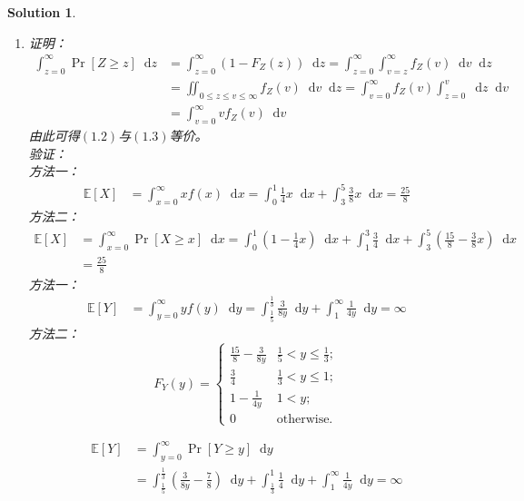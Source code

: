 \documentclass[a4paper,UTF8]{article}
\numberwithin{equation}{section}
\newtheorem*{mySol}{Solution}
\newcommand*\diff{\mathop{}\!\mathrm{d}}
\begin{document}
\begin{mySol}
\begin{enumerate}
\item 
证明：
\begin{equation}
\begin{aligned}
\int_{z=0}^{\infty}\Pr[Z\geq z] \diff z 
&= \int_{z=0}^{\infty}(1-F_Z(z)) \diff z = \int_{z=0}^{\infty}\int_{v=z}^{\infty}f_Z(v) \diff v \diff z\\
&= \iint_{0 \leq z \leq v \leq \infty}f_Z(v) \diff v \diff z = \int_{v=0}^{\infty}f_Z(v)\int_{z=0}^{v}\diff z \diff v \\
&= \int_{v=0}^{\infty}vf_Z(v)\diff v
\end{aligned}
\end{equation}
由此可得$(1.2)$与$(1.3)$等价。\\
验证：\\
方法一：
\begin{equation}
\begin{aligned}
\mathbb{E}[X] &= \int_{x=0}^{\infty}xf(x) \diff x = \int_{0}^{1}\frac{1}{4}x\diff x + \int_{3}^{5}\frac{3}{8}x\diff x =\frac{25}{8}
\end{aligned}
\end{equation}
方法二：
\begin{equation}
\begin{aligned}
\mathbb{E}[X] &= \int_{x=0}^{\infty}\Pr[X\geq x] \diff x = \int_{0}^{1}(1-\frac{1}{4}x)\diff x 
+ \int_{1}^{3}\frac{3}{4}\diff x
+ \int_{3}^{5}(\frac{15}{8}-\frac{3}{8}x)\diff x\\
&= \frac{25}{8}
\end{aligned}
\end{equation}
方法一：
\begin{equation}
\begin{aligned}
\mathbb{E}[Y] &= \int_{y=0}^{\infty}yf(y) \diff y = \int_{\frac{1}{5}}^{\frac{1}{3}}\frac{3}{8y}\diff y + \int_{1}^{\infty}\frac{1}{4y}\diff y = \infty
\end{aligned}
\end{equation}
方法二：
\begin{equation}
F_Y(y) =
\begin{cases}
\frac{15}{8} - \frac{3}{8y} & \frac{1}{5}<y\leq\frac{1}{3};\\
\frac{3}{4} & \frac{1}{3} < y \leq 1;\\
1-\frac{1}{4y} & 1 < y;\\
0 & \mbox{otherwise.}
\end{cases}
\end{equation}

\begin{equation}
\begin{aligned}
\mathbb{E}[Y] &= \int_{y=0}^{\infty}\Pr[Y \geq y] \diff y\\ 
&= \int_{\frac{1}{5}}^{\frac{1}{3}}(\frac{3}{8y} - \frac{7}{8}) \diff y + \int_{\frac{1}{3}}^{1}\frac{1}{4}\diff y + \int_{1}^{\infty}\frac{1}{4y}\diff y =\infty
\end{aligned}
\end{equation}

\end{enumerate}

\end{mySol}
\end{document}
